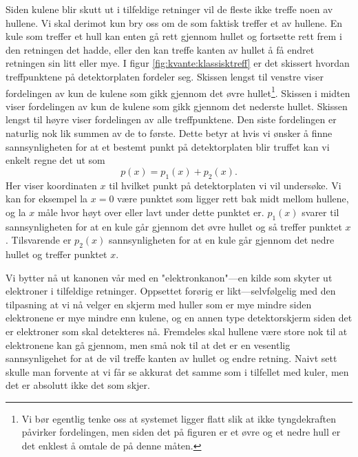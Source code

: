 Siden kulene blir skutt ut i tilfeldige retninger vil de fleste ikke treffe noen av hullene. Vi skal derimot kun bry oss om de som faktisk treffer et av hullene. En kule som treffer et hull kan enten gå rett gjennom hullet og fortsette rett frem i den retningen det hadde, eller den kan treffe kanten av hullet å få endret retningen sin litt eller mye. I figur \ref{fig:kvante:klassisktreff} er det skissert hvordan treffpunktene på detektorplaten fordeler seg. Skissen lengst til venstre viser fordelingen av kun de kulene som gikk gjennom det øvre hullet\footnote{Vi bør egentlig tenke oss at systemet ligger flatt slik at ikke tyngdekraften påvirker fordelingen, men siden det på figuren er et øvre og et nedre hull er det enklest å omtale de på denne måten.}. Skissen i midten viser fordelingen av kun de kulene som gikk gjennom det nederste hullet. Skissen lengst til høyre viser fordelingen av alle treffpunktene. Den siste fordelingen er naturlig nok lik summen av de to første. Dette betyr at hvis vi ønsker å finne sannsynligheten for at et bestemt punkt på detektorplaten blir truffet kan vi enkelt regne det ut som
\begin{displaymath}
	p(x) = p_1(x) + p_2(x).
\end{displaymath}
Her viser koordinaten $x$ til hvilket punkt på detektorplaten vi vil undersøke. Vi kan for eksempel la $x=0$ være punktet som ligger rett bak midt mellom hullene, og la $x$ måle hvor høyt over eller lavt under dette punktet er. $p_1(x)$ svarer til sannsynligheten for at en kule går gjennom det øvre hullet og så treffer punktet $x$. Tilsvarende er $p_2(x)$ sannsynligheten for at en kule går gjennom det nedre hullet og treffer punktet $x$. 

Vi bytter nå ut kanonen vår med en "elektronkanon"---en kilde som skyter ut elektroner i tilfeldige retninger. Oppsettet forørig er likt---selvfølgelig med den tilpasning at vi nå velger en skjerm med huller som er mye mindre siden elektronene er mye mindre enn kulene, og en annen type detektorskjerm siden det er elektroner som skal detekteres nå. Fremdeles skal hullene være store nok til at elektronene kan gå gjennom, men små nok til at det er en vesentlig sannsynligehet for at de vil treffe kanten av hullet og endre retning. Naivt sett skulle man forvente at vi får se akkurat det samme som i tilfellet med kuler, men det er absolutt ikke det som skjer.

